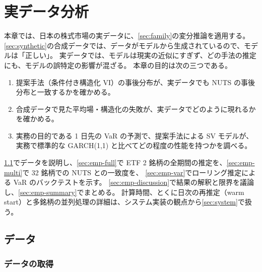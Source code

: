 \section{実データ分析}\label{sec:empirical}

本章では、日本の株式市場の実データに、\cref{sec:family}の変分推論を適用する。
\cref{sec:synthetic}の合成データでは、データがモデルから生成されているので、モデルは「正しい」。
実データでは、モデルは現実の近似にすぎず、どの手法の推定にも、モデルの誤特定の影響が混ざる。
本章の目的は次の三つである。

\begin{enumerate}[label=(\roman*)]
  \item 提案手法（条件付き構造化 VI）の事後分布が、実データでも NUTS の事後分布と一致するかを確かめる。
  \item 合成データで見た平均場・構造化の失敗が、実データでどのように現れるかを確かめる。
  \item 実務の目的である 1 日先の VaR の予測で、提案手法による SV モデルが、実務で標準的な GARCH(1,1) と比べてどの程度の性能を持つかを調べる。
\end{enumerate}

\cref{sec:emp-data}でデータを説明し、\cref{sec:emp-full}で ETF 2 銘柄の全期間の推定を、\cref{sec:emp-multi}で 32 銘柄での NUTS との一致度を、
\cref{sec:emp-var}でローリング推定による VaR のバックテストを示す。
\cref{sec:emp-discussion}で結果の解釈と限界を議論し、\cref{sec:emp-summary}でまとめる。
計算時間、とくに日次の再推定（warm start）と多銘柄の並列処理の詳細は、システム実装の観点から\cref{sec:system}で扱う。

\subsection{データ}\label{sec:emp-data}

\subsubsection{データの取得}

